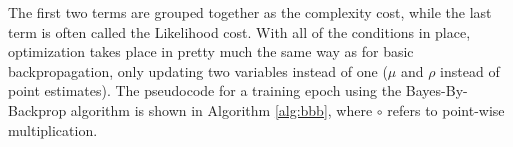 	\vspace*{2mm}
	The first two terms are grouped together as the complexity cost, while the last term is often called the Likelihood cost. With all of the conditions in place, optimization takes place in pretty much the same way as for basic backpropagation, only updating two variables instead of one ($\mu$ and $\rho$ instead of point estimates). The pseudocode for a training epoch using the Bayes-By-Backprop algorithm is shown in Algorithm \ref{alg:bbb}, where $\circ$ refers to point-wise multiplication.
	
%			
	
